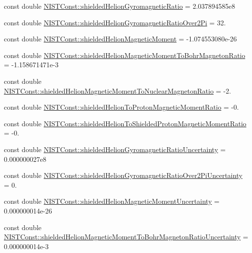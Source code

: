 \begin{DoxyCompactItemize}
\item 
const double \hyperlink{group___n_i_s_t_const-_helion_gaf3b7dabd6de7a263aba710256e793c8e}{N\+I\+S\+T\+Const\+::shielded\+Helion\+Gyromagnetic\+Ratio} = 2.\+037894585e8
\item 
const double \hyperlink{group___n_i_s_t_const-_helion_gaed43f2ab9c5e89c6dda577a3b5fc265c}{N\+I\+S\+T\+Const\+::shielded\+Helion\+Gyromagnetic\+Ratio\+Over2\+Pi} = 32.
\item 
const double \hyperlink{group___n_i_s_t_const-_helion_ga1b0f92c14390afe726af4005e21c2ae8}{N\+I\+S\+T\+Const\+::shielded\+Helion\+Magnetic\+Moment} = -\/1.\+074553080e-\/26
\item 
const double \hyperlink{group___n_i_s_t_const-_helion_gac48304d45406c207fbadeca604d5c71a}{N\+I\+S\+T\+Const\+::shielded\+Helion\+Magnetic\+Moment\+To\+Bohr\+Magneton\+Ratio} = -\/1.\+158671471e-\/3
\item 
const double \hyperlink{group___n_i_s_t_const-_helion_gae3bf1eccb33e00a6da688959fd99bbb3}{N\+I\+S\+T\+Const\+::shielded\+Helion\+Magnetic\+Moment\+To\+Nuclear\+Magneton\+Ratio} = -\/2.
\item 
const double \hyperlink{group___n_i_s_t_const-_helion_ga9aa0ad55bc28f6402fcd872f9435547e}{N\+I\+S\+T\+Const\+::shielded\+Helion\+To\+Proton\+Magnetic\+Moment\+Ratio} = -\/0.
\item 
const double \hyperlink{group___n_i_s_t_const-_helion_ga3b8301672e9de426ef6bf13276b42acc}{N\+I\+S\+T\+Const\+::shielded\+Helion\+To\+Shielded\+Proton\+Magnetic\+Moment\+Ratio} = -\/0.
\item 
const double \hyperlink{group___n_i_s_t_const-_helion_ga2f3b1faa760be34cc23805484a9de01e}{N\+I\+S\+T\+Const\+::shielded\+Helion\+Gyromagnetic\+Ratio\+Uncertainty} = 0.\+000000027e8
\item 
const double \hyperlink{group___n_i_s_t_const-_helion_ga500ba901d47044d1bab3fb7ee6aeade1}{N\+I\+S\+T\+Const\+::shielded\+Helion\+Gyromagnetic\+Ratio\+Over2\+Pi\+Uncertainty} = 0.
\item 
const double \hyperlink{group___n_i_s_t_const-_helion_gac193c2838d54048db06099730d41faea}{N\+I\+S\+T\+Const\+::shielded\+Helion\+Magnetic\+Moment\+Uncertainty} = 0.\+000000014e-\/26
\item 
const double \hyperlink{group___n_i_s_t_const-_helion_ga1ec0d4d0683b482a857f58d3055b560a}{N\+I\+S\+T\+Const\+::shielded\+Helion\+Magnetic\+Moment\+To\+Bohr\+Magneton\+Ratio\+Uncertainty} = 0.\+000000014e-\/3
\item 

\end{DoxyCompactItemize}
